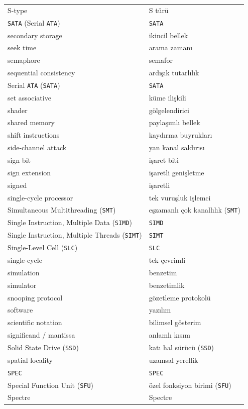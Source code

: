 {\begin{longtable}{@{}p{7.6cm}p{7.6cm}@{}}
S-type & S türü \\
\texttt{SATA} (Serial \texttt{ATA}) & \texttt{SATA} \\
secondary storage & ikincil bellek \\
seek time & arama zamanı \\
semaphore & semafor \\
sequential consistency & ardışık tutarlılık \\
Serial \texttt{ATA} (\texttt{SATA}) & \texttt{SATA} \\
set associative & küme ilişkili \\
shader & gölgelendirici \\
shared memory & paylaşımlı bellek \\
shift instructions & kaydırma buyrukları \\
side-channel attack & yan kanal saldırısı \\
sign bit & işaret biti \\
sign extension & işaretli genişletme \\
signed & işaretli \\
single-cycle processor & tek vuruşluk işlemci \\
Simultaneous Multithreading (\texttt{SMT}) & eşzamanlı çok kanallılık (\texttt{SMT}) \\
Single Instruction, Multiple Data (\texttt{SIMD}) & \texttt{SIMD} \\
Single Instruction, Multiple Threads (\texttt{SIMT}) & \texttt{SIMT} \\
Single-Level Cell (\texttt{SLC}) & \texttt{SLC} \\
single-cycle & tek çevrimli \\
simulation & benzetim \\
simulator & benzetimlik \\
snooping protocol & gözetleme protokolü \\
software & yazılım \\
scientific notation & bilimsel gösterim \\
significand / mantissa & anlamlı kısım \\
Solid State Drive (\texttt{SSD}) & katı hal sürücü (\texttt{SSD}) \\
spatial locality & uzamsal yerellik \\
\texttt{SPEC} & \texttt{SPEC} \\
Special Function Unit (\texttt{SFU}) & özel fonksiyon birimi (\texttt{SFU}) \\
Spectre & Spectre \\

\end{longtable}}
